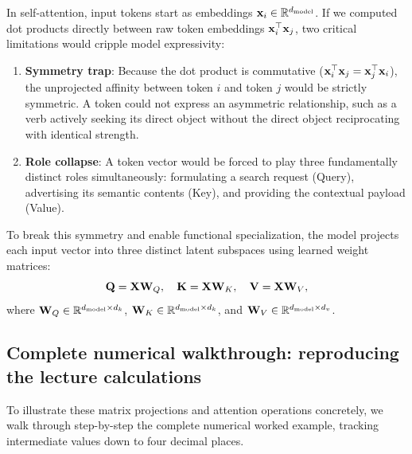 \documentclass[../../main.tex]{subfiles}
\begin{document}
In self-attention, input tokens start as embeddings $\mathbf{x}_i \in \mathbb{R}^{d_{\text{model}}}$. If we computed dot products directly between raw token embeddings $\mathbf{x}_i^\top \mathbf{x}_j$, two critical limitations would cripple model expressivity:
\begin{enumerate}
    \item \textbf{Symmetry trap}: Because the dot product is commutative ($\mathbf{x}_i^\top \mathbf{x}_j = \mathbf{x}_j^\top \mathbf{x}_i$), the unprojected affinity between token $i$ and token $j$ would be strictly symmetric. A token could not express an asymmetric relationship, such as a verb actively seeking its direct object without the direct object reciprocating with identical strength.
    \item \textbf{Role collapse}: A token vector would be forced to play three fundamentally distinct roles simultaneously: formulating a search request (Query), advertising its semantic contents (Key), and providing the contextual payload (Value).
\end{enumerate}
To break this symmetry and enable functional specialization, the model projects each input vector into three distinct latent subspaces using learned weight matrices:
\begin{equation}
\label{eq:qkv_linear_projections}
\mathbf{Q} = \mathbf{X} \mathbf{W}_Q, \quad \mathbf{K} = \mathbf{X} \mathbf{W}_K, \quad \mathbf{V} = \mathbf{X} \mathbf{W}_V,
\end{equation}
where $\mathbf{W}_Q \in \mathbb{R}^{d_{\text{model}} \times d_k}$, $\mathbf{W}_K \in \mathbb{R}^{d_{\text{model}} \times d_k}$, and $\mathbf{W}_V \in \mathbb{R}^{d_{\text{model}} \times d_v}$.

\subsection{Complete numerical walkthrough: reproducing the lecture calculations}
\label{subsec:complete_numerical_walkthrough}

To illustrate these matrix projections and attention operations concretely, we walk through step-by-step the complete numerical worked example, tracking intermediate values down to four decimal places.
\end{document}
